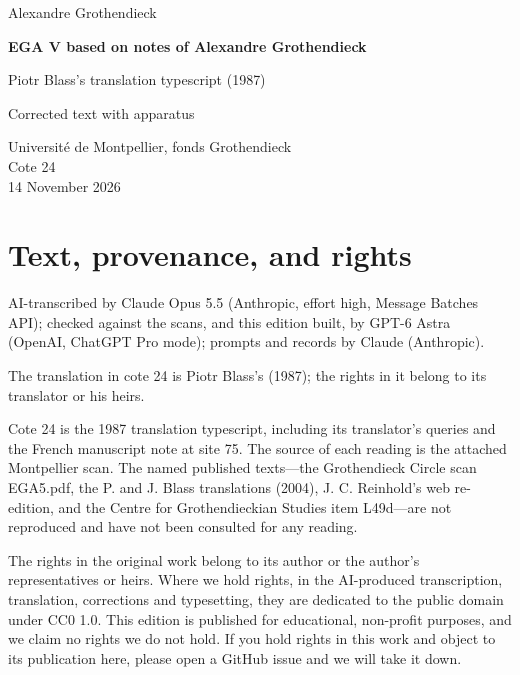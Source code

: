 \documentclass[10pt,a4paper]{article}
\newcommand{\EditionForm}{Corrected text with apparatus}
\begin{document}
\hypersetup{pageanchor=false}\begin{titlepage}\thispagestyle{empty}\vspace*{20mm}
{\Large Alexandre Grothendieck\par}\vspace{12mm}
{\Huge\bfseries EGA V based on notes of Alexandre Grothendieck\par}\vspace{8mm}
{\Large Piotr Blass's translation typescript (1987)\par}\vspace{7mm}
{\large\EditionForm\par}\vspace{12mm}
Université de Montpellier, fonds Grothendieck\\ Cote 24\\
14 November 2026
\vfill\end{titlepage}\clearpage\hypersetup{pageanchor=true}
\section*{Text, provenance, and rights}
AI-transcribed by Claude Opus 5.5 (Anthropic, effort high, Message Batches API); checked against the scans, and this edition built, by GPT-6 Astra (OpenAI, ChatGPT Pro mode); prompts and records by Claude (Anthropic).

The translation in cote 24 is Piotr Blass's (1987); the rights in it belong to its translator or his heirs.

Cote 24 is the 1987 translation typescript, including its translator's queries and the French manuscript note at site 75. The source of each reading is the attached Montpellier scan. The named published texts---the Grothendieck Circle scan EGA5.pdf, the P. and J. Blass translations (2004), J. C. Reinhold's web re-edition, and the Centre for Grothendieckian Studies item L49d---are not reproduced and have not been consulted for any reading.

The rights in the original work belong to its author or the author's representatives or heirs. Where we hold rights, in the AI-produced transcription, translation, corrections and typesetting, they are dedicated to the public domain under CC0 1.0. This edition is published for educational, non-profit purposes, and we claim no rights we do not hold. If you hold rights in this work and object to its publication here, please open a GitHub issue and we will take it down.
\end{document}
